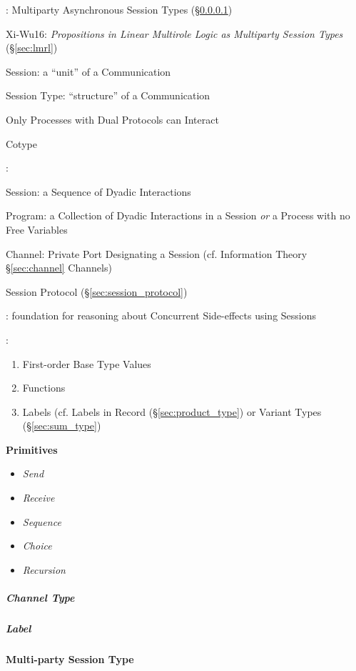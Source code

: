 \cite{honda-yoshida-carbone08}: Multiparty Asynchronous Session Types
(\S\ref{sec:multiparty_session})

Xi-Wu16: \emph{Propositions in Linear Multirole Logic as
  Multiparty Session Types} (\S\ref{sec:lmrl})

Session: a ``unit'' of a Communication

Session Type: ``structure'' of a Communication

Only Processes with Dual Protocols can Interact

Cotype


\cite{honda-vasconcelos-kubo98}:

Session: a Sequence of Dyadic Interactions

Program: a Collection of Dyadic Interactions in a Session \emph{or} a
Process with no Free Variables %

Channel: Private Port Designating a Session (cf. Information Theory
\S\ref{sec:channel} Channels)

Session Protocol (\S\ref{sec:session_protocol})


\cite{orchard-yoshida15}: foundation for reasoning about Concurrent
Side-effects using Sessions


\cite{neubauer-thiemann04}:
\begin{enumerate}
  \item First-order Base Type Values
  \item Functions
  \item Labels (cf. Labels in Record (\S\ref{sec:product_type}) or
    Variant Types (\S\ref{sec:sum_type})
\end{enumerate}


\textbf{Primitives}

\begin{itemize}
  \item \emph{Send}
  \item \emph{Receive}
  \item \emph{Sequence}
  \item \emph{Choice}
  \item \emph{Recursion}
\end{itemize}



\subparagraph{Channel Type}\label{sec:channel_type}\hfill

\subparagraph{Label}\label{sec:channel_label}\hfill



\paragraph{Multi-party Session Type}\label{sec:multiparty_session}\hfill

